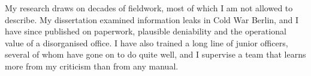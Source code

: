 
My research draws on decades of fieldwork, most of which I am not allowed to describe. My dissertation examined information leaks in Cold War Berlin, and I have since published on paperwork, plausible deniability and the operational value of a disorganised office. I have also trained a long line of junior officers, several of whom have gone on to do quite well, and I supervise a team that learns more from my criticism than from any manual.
